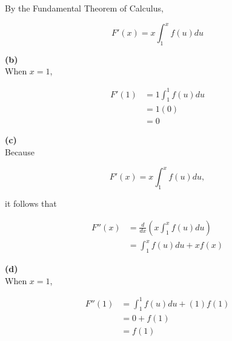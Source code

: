 \documentclass{article}
\begin{document}
    By the Fundamental Theorem of Calculus,

    \[
        F'(x) = x\int^x_1 f(u)du
    \]

    \textbf{(b)} \\
    When $x=1$,

    \begin{align*}
        F'(1)   &= 1 \int^1_1 f(u)du \\
                &= 1(0) \\
                &= 0
    \end{align*}

    \textbf{(c)} \\
    Because

    \[
        F'(x) = x\int^x_1 f(u)du,
    \]

    it follows that

    \begin{align*}
        F''(x)  &= \frac{d}{dx} \left(x\int^x_1 f(u)du\right) \\
                &= \int^x_1 f(u)du + xf(x)
    \end{align*}

    \pagebreak
    \thispagestyle{7}

    \textbf{(d)} \\
    When $x=1$,

    \begin{align*}
        F''(1)  &= \int^1_1 f(u)du + (1)f(1) \\
                &= 0 + f(1) \\
                &= f(1)
    \end{align*}
\end{document}
